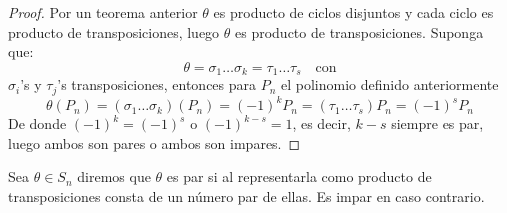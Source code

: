 
\begin{proof}
    Por un teorema anterior $\theta$ es producto de ciclos disjuntos y cada ciclo es producto de transposiciones, luego $\theta$ es producto de transposiciones. Suponga que:
    \begin{equation*}
        \theta = \sigma_1 \dots \sigma_k = \tau_1 \dots \tau_s \quad \text{con}
    \end{equation*}
    $\sigma_i$'s y $\tau_j$'s transposiciones, entonces para $P_n$ el polinomio definido anteriormente
    \begin{equation*}
        \theta(P_n) = (\sigma_1 \dots \sigma_k)(P_n) = (-1)^k P_n = (\tau_1 \dots \tau_s)P_n = (-1)^s P_n
    \end{equation*}
    De donde $(-1)^k = (-1)^s$ o $(-1)^{k-s} = 1$, es decir, $k-s$ siempre es par, luego ambos son pares o ambos son impares.
\end{proof}

\begin{defi}
    Sea $\theta \in S_n$ diremos que $\theta$ es par si al representarla como producto de transposiciones consta de un número par de ellas. Es impar en caso contrario.
\end{defi}


